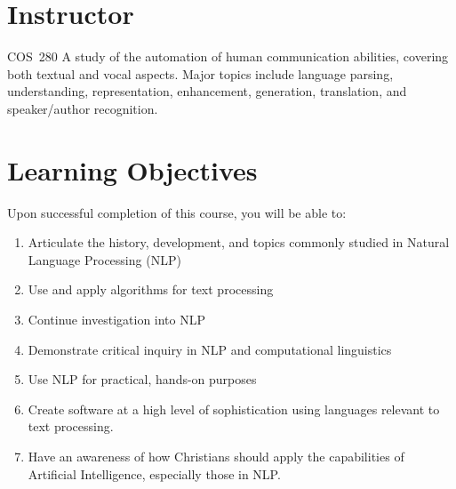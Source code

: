 \documentclass[11pt]{article}
\begin{document}


\section{Instructor}



\begin{catalogentry}{COS~280}
  A study of the automation of human communication abilities,
  covering both textual and vocal aspects.
  Major topics include language parsing, understanding, representation,
  enhancement, generation, translation,
  and speaker/author recognition.
\end{catalogentry}

\section{Learning Objectives}

Upon successful completion of this course,
you will be able to:
\begin{enumerate}
\item Articulate the history, development, and topics
  commonly studied in Natural Language Processing (NLP)
\item Use and apply algorithms for text processing
\item Continue investigation into NLP
\item Demonstrate critical inquiry in NLP and computational linguistics
\item Use NLP for practical, hands-on purposes
\item Create software at a high level of sophistication
  using languages relevant to text processing.
\item Have an awareness of how Christians should apply the capabilities
  of Artificial Intelligence, especially those in NLP.
\end{enumerate}
\end{document}
